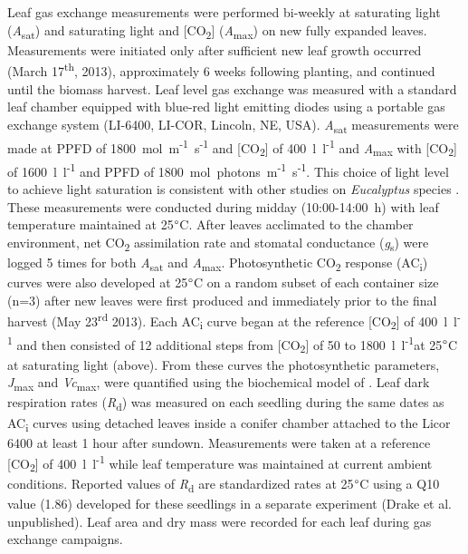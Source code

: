 \documentclass[a4paper]{article}\usepackage[]{graphicx}\usepackage[]{color}
\begin{document}
Leaf gas exchange measurements were performed bi-weekly at saturating light (\textit{A}\textsubscript{sat}) and saturating light and [CO\textsubscript{2}] (\textit{A}\textsubscript{max}) on new fully expanded leaves. Measurements were initiated only after sufficient new leaf growth occurred (March 17\textsuperscript{th}, 2013), approximately 6 weeks following planting, and continued until the biomass harvest. Leaf level gas exchange was measured with a standard leaf chamber equipped with blue-red light emitting diodes using a portable gas exchange system (LI-6400, LI-COR, Lincoln, NE, USA). \textit{A}\textsubscript{sat} measurements were made at PPFD of 1800~{\textmugreek}mol~m\textsuperscript{-1}~s\textsuperscript{-1} and [CO\textsubscript{2}] of 400~{\textmugreek}l~l\textsuperscript{-1} and \textit{A}\textsubscript{max} with [CO\textsubscript{2}] of 1600~{\textmugreek}l~l\textsuperscript{-1} and PPFD of 1800~{\textmugreek}mol~photons~m\textsuperscript{-1}~s\textsuperscript{-1}. This choice of light level to achieve light saturation is consistent with other studies on \textit{Eucalyptus} species \citep{kallarackal1997ecophysiological,pinkard1998photosynthetic,crous2013photosynthesis,drake2014capacity}. These measurements were conducted during midday (10:00-14:00~h) with leaf temperature maintained at 25$\degree$C. After leaves acclimated to the chamber environment, net CO\textsubscript{2} assimilation rate and stomatal conductance (\textit{g}\textsubscript{s}) were logged 5 times for both \textit{A}\textsubscript{sat} and \textit{A}\textsubscript{max}. Photosynthetic CO\textsubscript{2} response (AC\textsubscript{i}) curves were also developed at 25$\degree$C on a random subset of each container size (n=3) after new leaves were first produced and immediately prior to the final harvest (May 23\textsuperscript{rd} 2013). Each AC\textsubscript{i} curve began at the reference [CO\textsubscript{2}] of 400~{\textmugreek}l~l\textsuperscript{-1} and then consisted of 12 additional steps from [CO\textsubscript{2}] of 50 to 1800~{\textmugreek}l~l\textsuperscript{-1}at 25$\degree$C at saturating light (above). From these curves the photosynthetic parameters, \textit{J}\textsubscript{max} and \textit{Vc}\textsubscript{max}, were quantified using the biochemical model of \citet{farquhar1980biochemical}. Leaf dark respiration rates (\textit{R}\textsubscript{d}) was measured on each seedling during the same dates as AC\textsubscript{i} curves using detached leaves inside a conifer chamber attached to the Licor 6400 at least 1 hour after sundown.   Measurements were taken at a reference [CO\textsubscript{2}] of 400~{\textmugreek}l~l\textsuperscript{-1} while leaf temperature was maintained at current ambient conditions. Reported values of \textit{R}\textsubscript{d} are standardized rates at 25$\degree$C using a Q10 value (1.86) developed for these seedlings in a separate experiment (Drake et al. unpublished). Leaf area and dry mass were recorded for each leaf during gas exchange campaigns.
\end{document}
